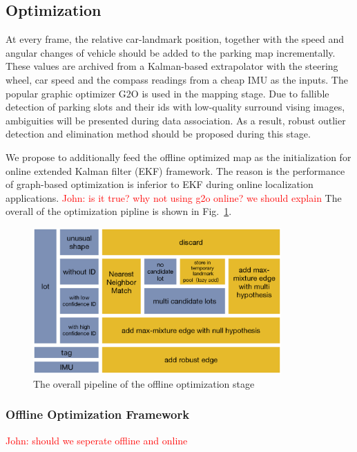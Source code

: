 \documentclass[journal]{IEEEtran}
\newcommand{\Reffig}[1]{Fig.~\ref{#1}}
\newcommand{\COMMENT}[1]{\textcolor{red}{#1}}
\begin{document}
\subsection{Optimization}

At every frame, the relative car-landmark position, together with the speed and angular changes of vehicle should be added to the parking map incrementally. 
These values are archived from a Kalman-based extrapolator with the steering wheel, car speed and the compass readings from a cheap IMU as the inputs.
The popular graphic optimizer G2O is used in the mapping stage\citep{K2011G2o}.
Due to fallible detection of parking slots and their ids with low-quality surround vising images, ambiguities will be presented during data association.
As a result, robust outlier detection and elimination method should be proposed during this stage.

%

We propose to additionally feed the offline optimized map as the initialization for online extended Kalman filter (EKF) framework.
The reason is the performance of graph-based optimization is inferior to EKF during online localization applications.
\COMMENT{John: is it true? why not using g2o online? we should explain}
The overall of the optimization pipline is shown in \Reffig{fig:8}. 

\begin{figure}
\centering
\includegraphics[height = 2.2in]{pic/fig8_Optimize}
\caption{
The overall pipeline of the offline optimization stage
}\label{fig:8}
\end{figure}

\subsubsection{Offline Optimization Framework}
\COMMENT{John: should we seperate offline and online }
\end{document}
